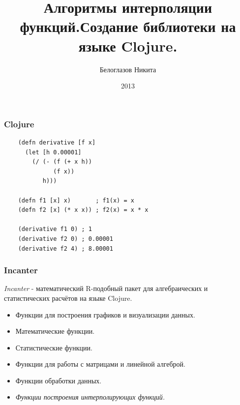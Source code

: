 \documentclass[rpussian]{beamer}
\title[Интерполяция]{Алгоритмы интерполяции функций.\newline Создание библиотеки на языке Clojure.}
\author{Белоглазов Никита}
\date{2013}
\institute{Белорусский Государственный Университет}
\begin{document}
\maketitle
\begin{frame}[fragile]
  \frametitle{Clojure}
  \begin{verbatim}
    (defn derivative [f x]
      (let [h 0.00001]
        (/ (- (f (+ x h))
              (f x))
           h)))

    (defn f1 [x] x)       ; f1(x) = x
    (defn f2 [x] (* x x)) ; f2(x) = x * x

    (derivative f1 0) ; 1
    (derivative f2 0) ; 0.00001
    (derivative f2 4) ; 8.00001
  \end{verbatim}
\end{frame}

\begin{frame}
  \frametitle{Incanter}

  \emph{Incanter} - математический R-подобный пакет для алгебраических и статистических расчётов на языке Clojure.

  \begin{itemize}

  \item Функции для построения графиков и визуализации данных.

  \item Математические функции.

  \item Статистические функции.

  \item Функции для работы с матрицами и линейной алгеброй.

  \item Функции обработки данных.

  \item \emph{Функции построения интерполирующих функций.}
  \end{itemize}
\end{frame}
\end{document}
